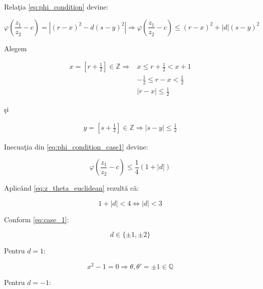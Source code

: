 \documentclass[12pt]{article}
\begin{document}
Relaţia \eqref{eq:phi_condition} devine:

\begin{equation} \label{eq:phi_condition_case1}
    \varphi \left(\frac{z_1}{z_2} - c\right)  = \left| (r-x)^2 - d(s-y)^2 \right| 
   \Rightarrow \varphi \left(\frac{z_1}{z_2} - c\right) \leq (r-x)^2 + |d|(s-y)^2
\end{equation}

Alegem

\begin{equation*}
\begin{split}
    x = \left[ r + \frac{1}{2} \right] \in \mathbb{Z} \Rightarrow & x \leq r + \frac{1}{2} < x + 1 \\
    & -\frac{1}{2} \leq r - x < \frac{1}{2} \\
    & \boxed{|r - x| \leq \frac{1}{2}}
\end{split}
\end{equation*}

şi

\begin{equation*}
\begin{split}
    y = \left[ s + \frac{1}{2} \right] \in \mathbb{Z} \Rightarrow \boxed{|s - y| \leq \frac{1}{2}}
\end{split}
\end{equation*}

Inecuaţia din \eqref{eq:phi_condition_case1} devine:

\begin{equation*}
    \varphi \left(\frac{z_1}{z_2} - c\right) \leq \frac{1}{4}(1 + |d|)
\end{equation*}

Aplicând \eqref{eq:z_theta_euclidean} rezultă că:

\begin{equation*}
    1 + |d| < 4 \Leftrightarrow |d| < 3
\end{equation*}

Conform \eqref{eq:case_1}:

\begin{equation*}
    d \in \{\pm 1, \pm 2\}
\end{equation*}

Pentru $d = 1$:

\begin{equation*}
    x^2 - 1 = 0 \Rightarrow \theta, \theta' = \pm 1 \in \mathbb{Q}
\end{equation*}

Pentru $d = -1$:
\end{document}
